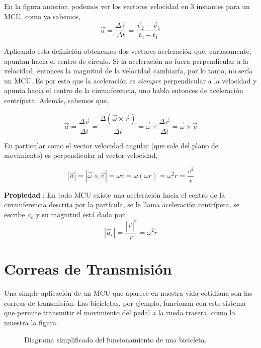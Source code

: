 \documentclass[letterpaper]{article}
\newcounter{propiedades}
\newcommand{\propi}{\stepcounter{propiedades} \textbf{Propiedad \thepropiedades}: }
\newenvironment{prop}
{ \begin{framed} \propi}
{ \end{framed} }
\begin{document}
En la figura anterior, podemos ver los vectores velocidad en 3 instantes para un MCU, como ya sabemos,
$$ \vec{a} = \frac{\Delta\vec{v}}{\Delta t} = \frac{\vec{v}_2 - \vec{v}_1}{t_2 - t_1}$$


Aplicando esta definición obtenemos dos vectores aceleración que, curiosamente, apuntan hacia el centro de circulo. Si la aceleración no fuera perpendicular a la velocidad, entonces la magnitud de la velocidad cambiaría, por lo tanto, no sería un MCU. Es por esto que la aceleración es \emph{siempre} perpendicular a la velocidad y apunta hacia el centro de la circunferencia, uno habla entonces de aceleración centrípeta. Además, sabemos que,

$$
\vec{a} = \frac{\Delta \vec{v}}{\Delta t} = \frac{\Delta (\vec{\omega}\times\vec{r})}{\Delta t} 
= \vec{\omega}\times\frac{\Delta \vec{r}}{\Delta t} = \vec{\omega} \times \vec{v}
$$

En particular como el vector velocidad angular (que sale del plano de movimiento) es perpendicular al vector velocidad, 

$$|\vec{a}| = |\vec{\omega} \times \vec{v}| = \omega v = \omega (\omega r) = \omega^2 r = \frac{v^2}{r}$$

\begin{prop}
En todo MCU existe una aceleración hacia el centro de la circunferencia descrita por la partícula, se le llama aceleración centrípeta, se escribe $a_c$ y su magnitud está dada por,
$$ |\vec{a}_c| = \frac{|\vec{v}|^2}{r} = \omega^2 r $$
\end{prop}

\section*{Correas de Transmisión}

Una simple aplicación de un MCU que aparece en nuestra vida cotidiana son las correas de transmisión. Las bicicletas, por ejemplo, funcionan con este sistema que permite transmitir el movimiento del pedal a la rueda trasera, como lo muestra la figura.

\begin{figure}[h]
\centering
{}
\caption{Diagrama simplificado del funcionamiento de una bicicleta.}
\end{figure}
\end{document}
